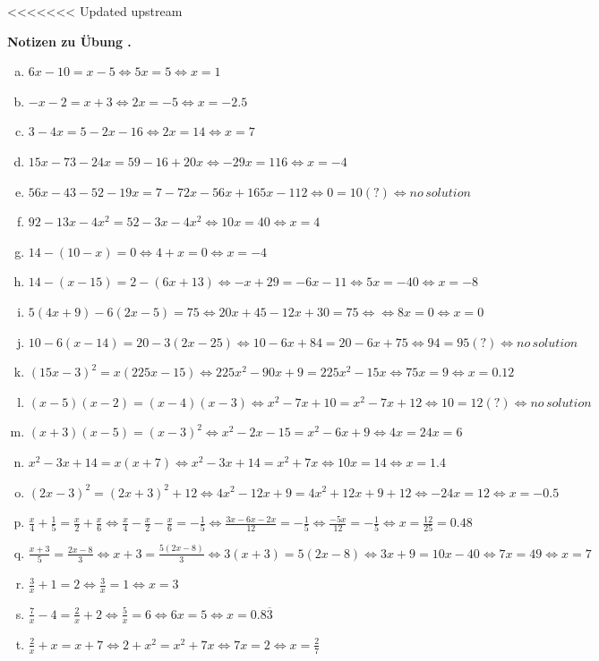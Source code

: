 \documentclass[%
11pt,%
twoside,%
titlepage,%
swissgerman,%
headsepline%
]{scrartcl}
\newcommand{\faReturnGray}{\textcolor{gray}{\faMailReply}} %
\theoremstyle{definition}
\theoremstyle{plain}
\theoremstyle{plain}
\newcommand{\concatueb}[1]{ueb:#1}%
\newcommand{\concatlsg}[1]{lsg:#1}%
\newcounter{uebcounter}[section]
\renewcommand{\theuebcounter}{\thesection.\arabic{uebcounter}}  %
\newenvironment{lsg}[1]{%
<<<<<<< Updated upstream
	\par\noindent\textbf{Notizen zu Übung \theuebcounter\label{\concatlsg{#1}}}
	\hfill\hyperref[\concatueb{#1}]{\faReturnGray}\par %
}{%
	\par%
}
\begin{document}
\begin{lsg}{lineareglagogo}
		\begin{enumerate}[a)]
			\item $6x-10=x-5 \Leftrightarrow 5x=5 \Leftrightarrow x={1}$
			\item $-x-2=x+3 \Leftrightarrow 2x=-5 \Leftrightarrow x={-2.5}$
			\item $3-4x=5-2x-16 \Leftrightarrow 2x=14 \Leftrightarrow x={7}$
			\item $15x-73-24x=59-16+20x  \Leftrightarrow -29x=116  \Leftrightarrow x={-4}$
			\item $56x-43-52-19x=7-72x-56x+165x-112  \Leftrightarrow 0 = 10 (?)\Leftrightarrow {no\, solution}$
			\item $92-13x-4x^2=52-3x-4x^2 \Leftrightarrow 10x=40\Leftrightarrow x={4}$
			\item $14-(10-x)=0 \Leftrightarrow 4+x=0 \Leftrightarrow x={-4} $
			\item $14-(x-15)=2-(6x+13) \Leftrightarrow -x+29= -6x-11 \Leftrightarrow 5x = -40 \Leftrightarrow x={-8}$
			\item $5(4x+9)-6(2x-5)=75 \Leftrightarrow 20x+45 -12x+30 = 75 \Leftrightarrow \Leftrightarrow 8x=0 \Leftrightarrow x={0}$
			\item $10-6(x-14)=20-3(2x-25) \Leftrightarrow 10-6x+84 = 20-6x+75 \Leftrightarrow 94=95(?) \Leftrightarrow {no \, solution}$
			\item $(15x-3)^2=x(225x-15) \Leftrightarrow 225x^2-90x+9 = 225x^2-15x \Leftrightarrow 75x = 9 \Leftrightarrow x={0.12}$
			\item $(x-5)(x-2)=(x-4)(x-3)\Leftrightarrow x^2-7x+10 = x^2-7x+12 \Leftrightarrow 10=12(?) \Leftrightarrow {no \, solution}$
			\item $(x+3)(x-5)=(x-3)^2\Leftrightarrow x^2-2x-15 = x^2-6x+9 \Leftrightarrow 4x=24  x={6}$
			\item $x^2-3x+14=x(x+7)\Leftrightarrow x^2-3x+14=x^2+7x \Leftrightarrow 10x=14 \Leftrightarrow x={1.4}$
			\item $(2x-3)^2=(2x+3)^2+12\Leftrightarrow 4x^2 -12x+9 = 4x^2+12x+9+12\Leftrightarrow -24x=12 \Leftrightarrow x={-0.5}$
			\item $\frac{x}{4}+\frac{1}{5}=\frac{x}{2}+\frac{x}{6}\Leftrightarrow \frac{x}{4}-\frac{x}{2}-\frac{x}{6} = -\frac{1}{5} \Leftrightarrow  \frac{3x-6x-2x}{12}=-\frac{1}{5} \Leftrightarrow \frac{-5x}{12}=-\frac{1}{5}\Leftrightarrow x=\frac{12}{25}={0.48}$
			\item $\frac{x+3}{5}=\frac{2x-8}{3}\Leftrightarrow x+3 = \frac{5(2x-8)}{3}\Leftrightarrow 3(x+3)=5(2x-8) \Leftrightarrow 3x+9=10x-40 \Leftrightarrow 7x=49 \Leftrightarrow x={7}$
			\item $\frac{3}{x}+1 = 2\Leftrightarrow \frac{3}{x}=1\Leftrightarrow x={3}$
			\item $\frac{7}{x}-4 = \frac{2}{x}+2\Leftrightarrow \frac{5}{x}=6 \Leftrightarrow 6x=5 \Leftrightarrow x={0.8\overline{3}}$
			\item $\frac{2}{x}+x = x+7\Leftrightarrow 2+x^2 = x^2+7x \Leftrightarrow 7x=2 \Leftrightarrow x={\frac{2}{7}}$  
		\end{enumerate}
	\end{lsg}
\end{document}

